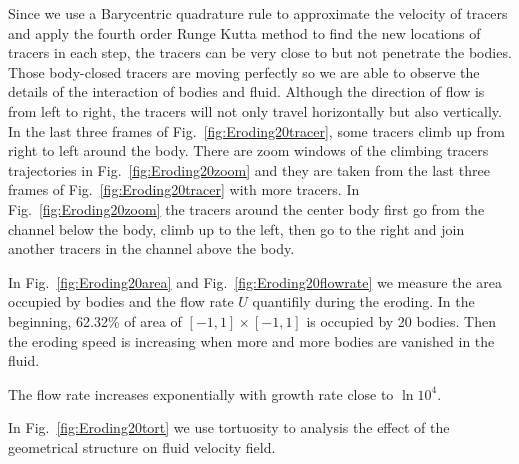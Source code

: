 \documentclass[preprint, 10pt]{elsarticle}
\begin{document}
{Since we use a Barycentric quadrature rule to approximate the velocity of tracers
and apply the fourth order Runge Kutta method to find the new locations of tracers in each step,
the tracers can be very close to but not penetrate the bodies. 
Those body-closed tracers are moving perfectly 
so we are able to observe the details of the interaction of bodies and fluid.
Although the direction of flow is from left to right, 
the tracers will not only travel horizontally but also vertically. 
In the last three frames of Fig.~\ref{fig:Eroding20tracer}, 
some tracers climb up from right to left around the body. 
There are zoom windows of the climbing tracers trajectories 
in Fig.~\ref{fig:Eroding20zoom} and they are taken from the 
last three frames of Fig.~\ref{fig:Eroding20tracer} with more tracers. 
In Fig.~\ref{fig:Eroding20zoom} the tracers around 
the center body first go from the channel below the body, 
climb up to the left, then go to the right and join another tracers 
in the channel above the body. 

In Fig.~\ref{fig:Eroding20area} and Fig.~\ref{fig:Eroding20flowrate} we measure the area occupied by bodies and the flow rate $U$ quantifily during the eroding. In the beginning, 62.32\% of area of $[-1,1] \times [-1,1]$ is occupied by 20 bodies. Then the eroding speed is increasing when more and more bodies are vanished in the fluid. 

The flow rate increases exponentially with growth rate close to $\ln10^4$. 


In Fig.~\ref{fig:Eroding20tort} we use tortuosity to analysis the effect of the geometrical structure on fluid velocity field. }
\end{document}
